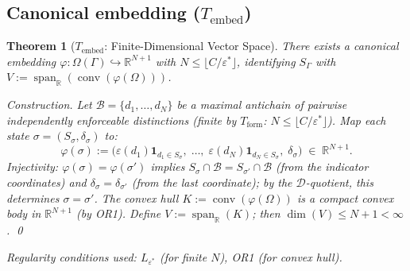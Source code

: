 \documentclass[11pt,a4paper]{article}
\newtheorem{theorem}{Theorem}[section]
\theoremstyle{definition}
\newcommand{\eps}{\varepsilon}
\DeclareMathOperator{\spn}{span}
\DeclareMathOperator{\conv}{conv}
\begin{document}
\subsection{Canonical embedding ($T_{\mathrm{embed}}$)}

\begin{theorem}[$T_{\mathrm{embed}}$: Finite-Dimensional Vector Space]\label{thm:Tembed}
There exists a canonical embedding $\varphi: \Omega(\Gamma) \hookrightarrow \mathbb{R}^{N+1}$ with $N \le \lfloor C/\eps^* \rfloor$, identifying $S_\Gamma$ with $V := \spn_\mathbb{R}(\conv(\varphi(\Omega)))$.

\noindent\textit{Construction.}  Let $\mathcal{B} = \{d_1, \ldots, d_N\}$ be a maximal antichain of pairwise independently enforceable distinctions (finite by $T_{\mathrm{form}}$: $N \le \lfloor C/\eps^*\rfloor$).  Map each state $\sigma = (S_\sigma, \delta_\sigma)$ to:
\[
\varphi(\sigma) := \bigl(\eps(d_1)\mathbf{1}_{d_1 \in S_\sigma},\; \ldots,\; \eps(d_N)\mathbf{1}_{d_N \in S_\sigma},\; \delta_\sigma\bigr) \;\in\; \mathbb{R}^{N+1}.
\]
Injectivity: $\varphi(\sigma) = \varphi(\sigma')$ implies $S_\sigma \cap \mathcal{B} = S_{\sigma'} \cap \mathcal{B}$ (from the indicator coordinates) and $\delta_\sigma = \delta_{\sigma'}$ (from the last coordinate); by the $\mathcal{D}$-quotient, this determines $\sigma = \sigma'$.  The convex hull $K := \conv(\varphi(\Omega))$ is a compact convex body in $\mathbb{R}^{N+1}$ (by OR1).  Define $V := \spn_\mathbb{R}(K)$; then $\dim(V) \le N+1 < \infty$.  \qed

\noindent\textit{Regularity conditions used:} $L_{\eps^*}$ (for finite $N$), OR1 (for convex hull).
\end{theorem}
\end{document}
